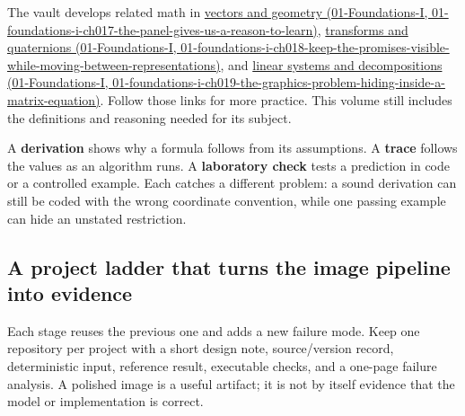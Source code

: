 The vault develops related math in \href{../01-Foundations-I/main.pdf\#nameddest=01-foundations-i-ch017-the-panel-gives-us-a-reason-to-learn}{vectors and geometry (01-Foundations-I, 01-foundations-i-ch017-the-panel-gives-us-a-reason-to-learn)}, \href{../01-Foundations-I/main.pdf\#nameddest=01-foundations-i-ch018-keep-the-promises-visible-while-moving-between-representations}{transforms and quaternions (01-Foundations-I, 01-foundations-i-ch018-keep-the-promises-visible-while-moving-between-representations)}, and \href{../01-Foundations-I/main.pdf\#nameddest=01-foundations-i-ch019-the-graphics-problem-hiding-inside-a-matrix-equation}{linear systems and decompositions (01-Foundations-I, 01-foundations-i-ch019-the-graphics-problem-hiding-inside-a-matrix-equation)}. Follow those links for more practice. This volume still includes the definitions and reasoning needed for its subject.

A \textbf{derivation} shows why a formula follows from its assumptions. A \textbf{trace} follows the values as an algorithm runs. A \textbf{laboratory check} tests a prediction in code or a controlled example. Each catches a different problem: a sound derivation can still be coded with the wrong coordinate convention, while one passing example can hide an unstated restriction.

\subsection{A project ladder that turns the image pipeline into evidence}\label{03-visual-computing-i-ch001-a-project-ladder-that-turns-the-image-pipeline-into-evidence}

Each stage reuses the previous one and adds a new failure mode. Keep one repository per project with a short design note, source/version record, deterministic input, reference result, executable checks, and a one-page failure analysis. A polished image is a useful artifact; it is not by itself evidence that the model or implementation is correct.


